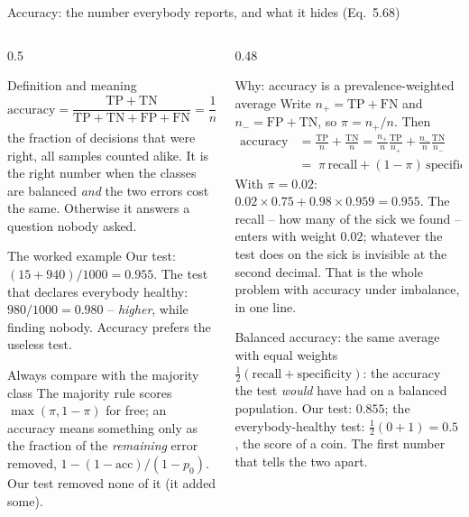 \documentclass[10pt,aspectratio=169]{beamer}
\begin{document}
\begin{frame}{Accuracy: the number everybody reports, and what it hides (Eq.~5.68)}
\small
\begin{columns}[T]
\begin{column}{0.5\textwidth}
\begin{block}{Definition and meaning}
\scriptsize
\[
  \mathrm{accuracy}=\frac{\mathrm{TP}+\mathrm{TN}}{\mathrm{TP}+\mathrm{TN}+\mathrm{FP}+\mathrm{FN}}
  =\frac{1}{n}\sum_{i=1}^{n}I(y_i=\tilde y_i):
\]
the fraction of decisions that were right, all samples counted alike.  It
is the right number when the classes are balanced \emph{and} the two
errors cost the same.  Otherwise it answers a question nobody asked.
\end{block}
\begin{block}{The worked example}
\scriptsize
Our test: $(15+940)/1000=\mathbf{0.955}$.  The test that declares
everybody healthy: $980/1000=\mathbf{0.980}$ -- \emph{higher}, while
finding nobody.  Accuracy prefers the useless test.
\end{block}
\begin{block}{Always compare with the majority class}
\scriptsize
The majority rule scores $\max(\pi,1-\pi)$ for free; an accuracy means
something only as the fraction of the \emph{remaining} error removed,
$1-(1-\mathrm{acc})/(1-p_0)$.  Our test removed none of it (it added some).
\end{block}
\end{column}
\begin{column}{0.48\textwidth}
\begin{block}{Why: accuracy is a prevalence-weighted average}
\scriptsize
Write $n_+=\mathrm{TP}+\mathrm{FN}$ and $n_-=\mathrm{FP}+\mathrm{TN}$, so
$\pi=n_+/n$.  Then
\begin{align*}
  \mathrm{accuracy}&=\frac{\mathrm{TP}}{n}+\frac{\mathrm{TN}}{n}
   =\frac{n_+}{n}\frac{\mathrm{TP}}{n_+}+\frac{n_-}{n}\frac{\mathrm{TN}}{n_-}\\
  &=\boxed{\;\pi\,\mathrm{recall}+(1-\pi)\,\mathrm{specificity}\;}
\end{align*}
With $\pi=0.02$: $0.02\times0.75+0.98\times0.959=0.955$.  The recall --
how many of the sick we found -- enters with weight $0.02$; whatever the
test does on the sick is invisible at the second decimal.  That is the
whole problem with accuracy under imbalance, in one line.
\end{block}
\begin{block}{Balanced accuracy: the same average with equal weights}
\scriptsize
$\tfrac12(\mathrm{recall}+\mathrm{specificity})$: the accuracy the test
\emph{would} have had on a balanced population.  Our test: $0.855$; the
everybody-healthy test: $\tfrac12(0+1)=0.5$, the score of a coin.  The
first number that tells the two apart.
\end{block}
\end{column}
\end{columns}
\end{frame}
\end{document}
